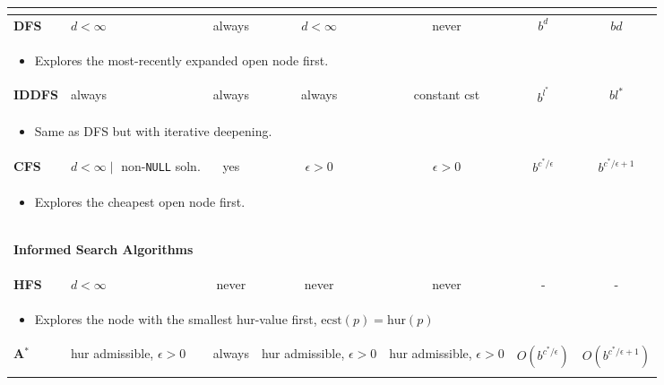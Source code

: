 \begin{summary}
\begin{center}
\begin{tabular}{llccccc}
{\begin{itemize}
        \end{itemize}} \\
        \midrule
        \textbf{DFS} & $d<\infty$ & always & $d < \infty$ & never & $b^{d}$ & $bd$ \\
        \multicolumn{7}{p{\linewidth}}{
        \begin{itemize}
            \item Explores the most-recently expanded open node first.
        \end{itemize}} \\
        \midrule
        \textbf{IDDFS} & always & always & always & constant cst & $b^{l^{*}}$ & $bl^{*}$ \\
        \multicolumn{7}{p{\linewidth}}{
        \begin{itemize}
            \item Same as DFS but with iterative deepening.
        \end{itemize}} \\
        \midrule
        \textbf{CFS} & $d<\infty \mid$ non-\texttt{NULL} soln. & yes & $\epsilon >0$ & $\epsilon >0$ & $b^{c^{*} / \epsilon}$ & $b^{c^{*}/\epsilon + 1}$ \\
        \multicolumn{7}{p{\linewidth}}{
        \begin{itemize}
            \item Explores the cheapest open node first.
        \end{itemize}} \\
        \midrule
        \multicolumn{7}{p{\linewidth}}{
        \begin{center}
            \textbf{Informed Search Algorithms}
        \end{center}} \\
        \midrule
        \textbf{HFS} & $d<\infty$ & never & never & never & - & - \\
        \multicolumn{7}{p{\linewidth}}{
        \begin{itemize}
            \item Explores the node with the smallest hur-value first, $\text{ecst}(p) = \text{hur}(p)$
        \end{itemize}} \\
        \midrule
        \textbf{A$^*$} & hur admissible, $\epsilon > 0$ & always & hur admissible, $\epsilon > 0$ & hur admissible, $\epsilon > 0$ & $O\left(b^{c^{*}/\epsilon}\right)$ & $O\left(b^{c^{*}/\epsilon + 1}\right)$ \\
        \multicolumn{7}{p{\linewidth}}{
}
\end{tabular}
\end{center}
\end{summary}
